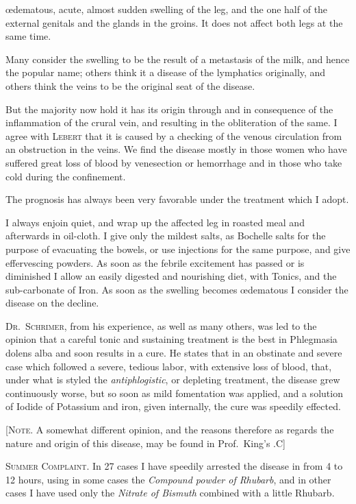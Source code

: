 œdematous, acute, almost sudden swelling of the leg, and the one half
of the external genitals and the glands in the groins. It does not
affect both legs at the same time.

Many consider the swelling to be the result of a metastasis of the
milk, and hence the popular name; others think it a disease of the
lymphatics originally, and others think the veins to be the original
seat of the disease.

But the majority now hold it has its origin through and in consequence
of the inflammation of the crural vein, and resulting in the
obliteration of the same. I agree with \textsc{Lebert} that it is caused by a
checking of the venous circulation from an obstruction in the veins.
We find the disease mostly in those women who have suffered great
loss of blood by venesection or hemorrhage and in those who take cold
during the confinement.

The prognosis has always been very favorable under the treatment
which I adopt.

I always enjoin quiet, and wrap up the affected leg in roasted meal
and afterwards in oil-cloth. I give only the mildest salts, as Bochelle
salts for the purpose of evacuating the bowels, or use injections for
the same purpose, and give effervescing powders. As soon as the
febrile excitement has passed or is diminished I allow an easily digested
and nourishing diet, with Tonics, and the sub-carbonate of Iron. As
soon as the swelling becomes œdematous I consider the disease on the
decline.

\textsc{Dr.\ Schrimer}, from his experience, as well as many others, was led
to the opinion that a careful tonic and sustaining treatment is the best
in Phlegmasia dolens alba and soon results in a cure. He states that
in an obstinate and severe case which followed a severe, tedious labor,
with extensive loss of blood, that, under what is styled the \emph{antiphlogistic},
or depleting treatment, the disease grew continuously worse, but
so soon as mild fomentation was applied, and a solution of Iodide of
Potassium and iron, given internally, the cure was speedily effected.

[\textsc{Note}. A somewhat different opinion, and the reasons therefore as
regards the nature and origin of this disease, may be found in Prof.\ King's
.\hfill{}C]

\textsc{Summer Complaint}. In 27 cases I have speedily arrested the disease
in from 4 to 12 hours, using in some cases the \emph{Compound powder
of Rhubarb}, and in other cases I have used only the \emph{Nitrate of Bismuth}
combined with a little Rhubarb.\endinput
